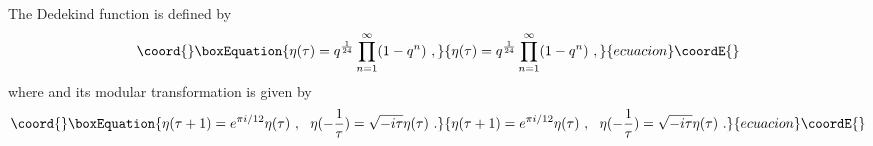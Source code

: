 \documentclass[a4paper,12pt]{article}
\begin{document}
The Dedekind \myHighlight{$\eta$}\coordHE{} function is defined by
\begin{equation}\coord{}\boxEquation{
 \eta (\tau) = q^{\frac{1}{24}} \prod_{n=1}^{\infty} (1 - q^n) ~,
}{
 \eta (\tau) = q^{\frac{1}{24}} \prod_{n=1}^{\infty} (1 - q^n) ~,
}{ecuacion}\coordE{}\end{equation}
where \coordHE{} and its modular transformation is given by
\begin{equation}\coord{}\boxEquation{
 \eta (\tau + 1) =
  e^{\pi i / 12} \eta (\tau) ~,~~
 \eta (- \frac{1}{\tau}) =
  \sqrt{-i \tau} \eta (\tau) ~.
\label{etam}
}{
 \eta (\tau + 1) =
  e^{\pi i / 12} \eta (\tau) ~,~~
 \eta (- \frac{1}{\tau}) =
  \sqrt{-i \tau} \eta (\tau) ~.
}{ecuacion}\coordE{}\end{equation} 

\end{document}
